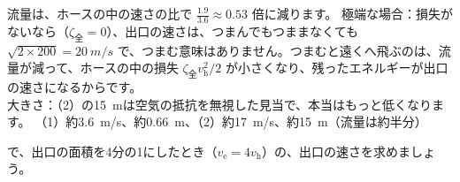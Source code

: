 \begin{phreidai}
流量は、ホースの中の速さの比で $\tfrac{1.9}{3.6}\approx0.53$ 倍に減ります。
\phtashikame
極端な場合：損失がないなら（$\zeta_{\text{全}}=0$）、出口の速さは、つまんでもつままなくても $\sqrt{2\times200}=\qty{20}{m/s}$ で、つまむ意味はありません。つまむと遠くへ飛ぶのは、流量が減って、ホースの中の損失 $\zeta_{\text{全}}v_{\mathrm h}^2/2$ が小さくなり、残ったエネルギーが出口の速さになるからです。\\
大きさ：（2）の\qty{15}{m}は空気の抵抗を無視した見当で、本当はもっと低くなります。
\kotae （1）約\qty{3.6}{m/s}、約\qty{0.66}{m}、（2）約\qty{17}{m/s}、約\qty{15}{m}（流量は約半分）
\end{phreidai}
\begin{jibun}
で、出口の面積を4分の1にしたとき（$v_{\mathrm e}=4v_{\mathrm h}$）の、出口の速さを求めましょう。
\end{jibun}

